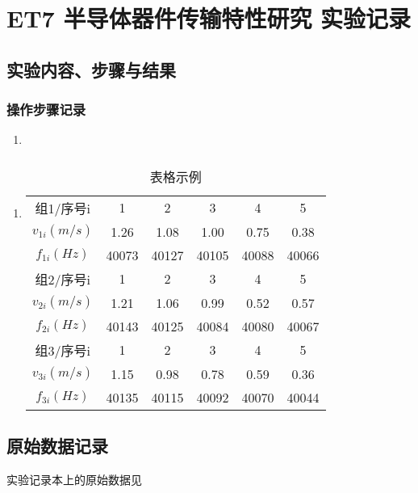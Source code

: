 \documentclass[dvipsnames, svgnames,a4paper,11pt]{article}
\begin{document}
	\section{ET7 半导体器件传输特性研究  \quad\heiti 实验记录}
	
	\subsection{实验内容、步骤与结果}
	
	\subsubsection{操作步骤记录}
	\begin{enumerate}
		\item 
	\end{enumerate}	
	
	\subsubsection{}
	\begin{enumerate}
		\item \begin{table}[h]
			\centering
			\caption{表格示例}
			\label{tab:tab1}
			\begin{tabular}{|c|c|c|c|c|c|}
				\hline
				组1/序号i & 1 & 2 & 3 & 4 & 5 \\
				$v_{1i}(m/s)$ & 1.26 & 1.08 & 1.00 & 0.75 & 0.38 \\
				$f_{1i}(Hz)$ & 40073 & 40127 & 40105 & 40088 & 40066 \\
				\hline
				组2/序号i & 1 & 2 & 3 & 4 & 5 \\
				$v_{2i}(m/s)$ & 1.21 & 1.06 & 0.99 & 0.52 & 0.57 \\
				$f_{2i}(Hz)$ & 40143 & 40125 & 40084 & 40080 & 40067 \\
				\hline
				组3/序号i & 1 & 2 & 3 & 4 & 5 \\
				$v_{3i}(m/s)$ & 1.15 & 0.98 & 0.78 & 0.59 & 0.36 \\
				$f_{3i}(Hz)$ & 40135 & 40115 & 40092 & 40070 & 40044 \\
				\hline
			\end{tabular}
		\end{table}		
	\end{enumerate}
	
	
	\clearpage
	\subsection{原始数据记录}
	实验记录本上的原始数据见%
	
\end{document}

